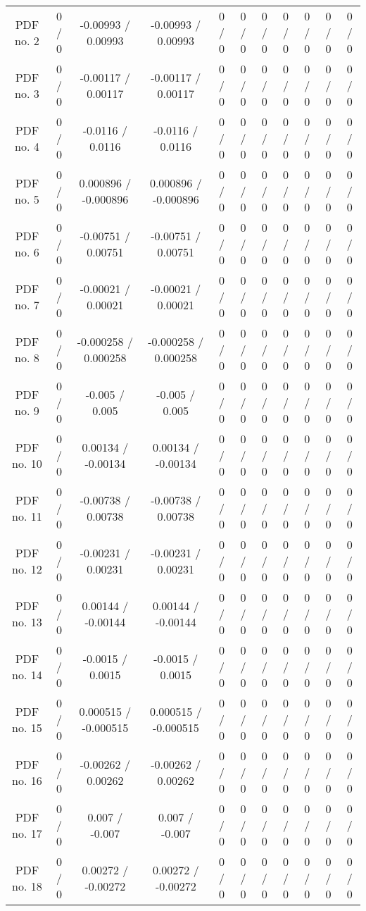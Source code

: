 \begin{table}[htbp]
\begin{center}
\begin{tabular}{|c|c|c|c|c|c|c|c|c|c|c|}
  PDF no. 2 & 0 / 0 & -0.00993 / 0.00993 & -0.00993 / 0.00993 & 0 / 0 & 0 / 0 & 0 / 0 & 0 / 0 & 0 / 0 & 0 / 0 & 0 / 0 \\ 
  PDF no. 3 & 0 / 0 & -0.00117 / 0.00117 & -0.00117 / 0.00117 & 0 / 0 & 0 / 0 & 0 / 0 & 0 / 0 & 0 / 0 & 0 / 0 & 0 / 0 \\ 
  PDF no. 4 & 0 / 0 & -0.0116 / 0.0116 & -0.0116 / 0.0116 & 0 / 0 & 0 / 0 & 0 / 0 & 0 / 0 & 0 / 0 & 0 / 0 & 0 / 0 \\ 
  PDF no. 5 & 0 / 0 & 0.000896 / -0.000896 & 0.000896 / -0.000896 & 0 / 0 & 0 / 0 & 0 / 0 & 0 / 0 & 0 / 0 & 0 / 0 & 0 / 0 \\ 
  PDF no. 6 & 0 / 0 & -0.00751 / 0.00751 & -0.00751 / 0.00751 & 0 / 0 & 0 / 0 & 0 / 0 & 0 / 0 & 0 / 0 & 0 / 0 & 0 / 0 \\ 
  PDF no. 7 & 0 / 0 & -0.00021 / 0.00021 & -0.00021 / 0.00021 & 0 / 0 & 0 / 0 & 0 / 0 & 0 / 0 & 0 / 0 & 0 / 0 & 0 / 0 \\ 
  PDF no. 8 & 0 / 0 & -0.000258 / 0.000258 & -0.000258 / 0.000258 & 0 / 0 & 0 / 0 & 0 / 0 & 0 / 0 & 0 / 0 & 0 / 0 & 0 / 0 \\ 
  PDF no. 9 & 0 / 0 & -0.005 / 0.005 & -0.005 / 0.005 & 0 / 0 & 0 / 0 & 0 / 0 & 0 / 0 & 0 / 0 & 0 / 0 & 0 / 0 \\ 
  PDF no. 10 & 0 / 0 & 0.00134 / -0.00134 & 0.00134 / -0.00134 & 0 / 0 & 0 / 0 & 0 / 0 & 0 / 0 & 0 / 0 & 0 / 0 & 0 / 0 \\ 
  PDF no. 11 & 0 / 0 & -0.00738 / 0.00738 & -0.00738 / 0.00738 & 0 / 0 & 0 / 0 & 0 / 0 & 0 / 0 & 0 / 0 & 0 / 0 & 0 / 0 \\ 
  PDF no. 12 & 0 / 0 & -0.00231 / 0.00231 & -0.00231 / 0.00231 & 0 / 0 & 0 / 0 & 0 / 0 & 0 / 0 & 0 / 0 & 0 / 0 & 0 / 0 \\ 
  PDF no. 13 & 0 / 0 & 0.00144 / -0.00144 & 0.00144 / -0.00144 & 0 / 0 & 0 / 0 & 0 / 0 & 0 / 0 & 0 / 0 & 0 / 0 & 0 / 0 \\ 
  PDF no. 14 & 0 / 0 & -0.0015 / 0.0015 & -0.0015 / 0.0015 & 0 / 0 & 0 / 0 & 0 / 0 & 0 / 0 & 0 / 0 & 0 / 0 & 0 / 0 \\ 
  PDF no. 15 & 0 / 0 & 0.000515 / -0.000515 & 0.000515 / -0.000515 & 0 / 0 & 0 / 0 & 0 / 0 & 0 / 0 & 0 / 0 & 0 / 0 & 0 / 0 \\ 
  PDF no. 16 & 0 / 0 & -0.00262 / 0.00262 & -0.00262 / 0.00262 & 0 / 0 & 0 / 0 & 0 / 0 & 0 / 0 & 0 / 0 & 0 / 0 & 0 / 0 \\ 
  PDF no. 17 & 0 / 0 & 0.007 / -0.007 & 0.007 / -0.007 & 0 / 0 & 0 / 0 & 0 / 0 & 0 / 0 & 0 / 0 & 0 / 0 & 0 / 0 \\ 
  PDF no. 18 & 0 / 0 & 0.00272 / -0.00272 & 0.00272 / -0.00272 & 0 / 0 & 0 / 0 & 0 / 0 & 0 / 0 & 0 / 0 & 0 / 0 & 0 / 0 \\ 

\end{tabular}
\end{center}
\end{table}
